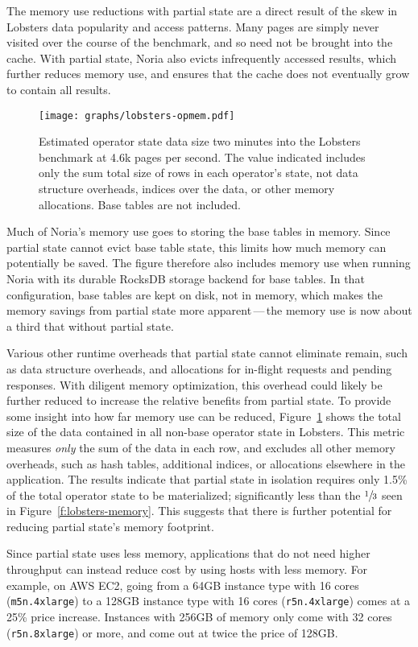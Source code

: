 The memory use reductions with partial state are a direct result of the skew in
Lobsters data popularity and access patterns. Many pages are simply never
visited over the course of the benchmark, and so need not be brought into the
cache. With partial state, Noria also evicts infrequently accessed results,
which further reduces memory use, and ensures that the cache does not eventually
grow to contain all results.

\begin{figure}[h]
  \centering
  \texttt{[image: graphs/lobsters-opmem.pdf]}
  \caption{Estimated operator state data size two minutes into the Lobsters
  benchmark at 4.6k pages per second. The value indicated includes only the sum
  total size of rows in each operator's state, not data structure overheads,
  indices over the data, or other memory allocations. Base tables are not
  included.}
  \label{f:lobsters-opmem}
\end{figure}

Much of Noria's memory use goes to storing the base tables in memory. Since
partial state cannot evict base table state, this limits how much memory can
potentially be saved. The figure therefore also includes memory use when running
Noria with its durable RocksDB storage backend for base tables. In that
configuration, base tables are kept on disk, not in memory, which makes the
memory savings from partial state more apparent\,---\,the memory use is now
about a third that without partial state.

Various other runtime overheads that partial state cannot eliminate remain, such
as data structure overheads, and allocations for in-flight requests and pending
responses. With diligent memory optimization, this overhead could likely be
further reduced to increase the relative benefits from partial state. To provide
some insight into how far memory use can be reduced,
Figure~\ref{f:lobsters-opmem} shows the total size of the data contained in all
non-base operator state in Lobsters. This metric measures \emph{only} the sum of
the data in each row, and excludes all other memory overheads, such as hash
tables, additional indices, or allocations elsewhere in the application. The
results indicate that partial state in isolation requires only 1.5\% of the
total operator state to be materialized; significantly less than the
$\sfrac{1}{3}$ seen in Figure~\ref{f:lobsters-memory}. This suggests that there
is further potential for reducing partial state's memory footprint.

Since partial state uses less memory, applications that do not need higher
throughput can instead reduce cost by using hosts with less memory. For example,
on AWS EC2, going from a 64GB instance type with 16 cores (\texttt{m5n.4xlarge})
to a 128GB instance type with 16 cores (\texttt{r5n.4xlarge}) comes at a 25\%
price increase. Instances with 256GB of memory only come with 32 cores
(\texttt{r5n.8xlarge}) or more, and come out at twice the price of 128GB.

